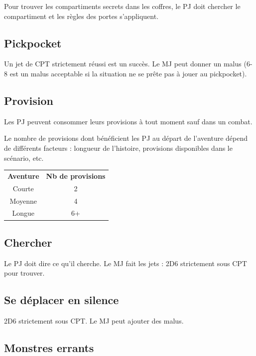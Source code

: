 \documentclass[a4paper, 11pt, twoside]{article}
\begin{document}
Pour trouver les compartiments secrets dans les coffres, le PJ doit chercher le compartiment et les règles des portes s'appliquent.

\subsection{Pickpocket}
\label{sec:org939c4e5}

Un jet de CPT strictement réussi est un succès. Le MJ peut donner un malus (6-8 est un malus acceptable si la situation ne se prête pas à jouer au pickpocket).

\subsection{Provision}
\label{sec:org36d2007}

Les PJ peuvent consommer leurs provisions à tout moment sauf dans un combat.

Le nombre de provisions dont bénéficient les PJ au départ de l'aventure dépend de différents facteurs : longueur de l'histoire, provisions disponibles dans le scénario, etc.

\begin{longtable}{cc}
\textbf{Aventure} & \textbf{Nb de provisions}\\
Courte & 2\\
Moyenne & 4\\
Longue & 6+\\
\end{longtable}

\subsection{Chercher}
\label{sec:org130b771}

Le PJ doit dire ce qu'il cherche. Le MJ fait les jets : 2D6 strictement sous CPT pour trouver.

\subsection{Se déplacer en silence}
\label{sec:org3898d16}

2D6 strictement sous CPT. Le MJ peut ajouter des malus.

\subsection{Monstres errants}
\label{sec:orgeb47cc9}
\end{document}
